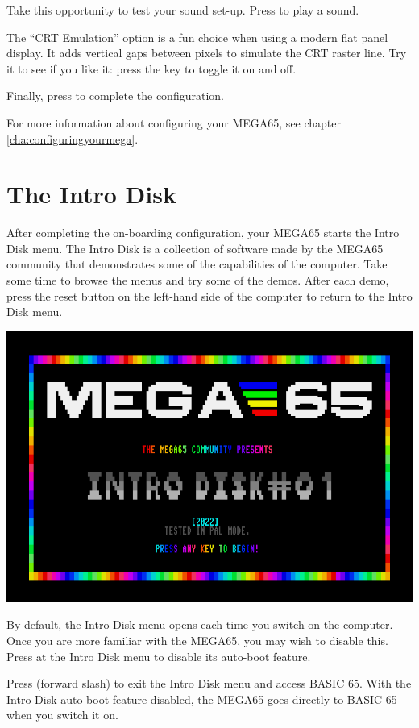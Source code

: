 Take this opportunity to test your sound set-up. Press  to play a sound.

The ``CRT Emulation'' option is a fun choice when using a modern flat panel display. It adds vertical gaps between pixels to simulate the CRT raster line. Try it to see if you like it: press the  key to toggle it on and off.

Finally, press  to complete the configuration.

For more information about configuring your MEGA65, see chapter \vref{cha:configuringyourmega}.

\section{The Intro Disk}

After completing the on-boarding configuration, your MEGA65 starts the Intro Disk menu. The Intro Disk is a collection of software made by the MEGA65 community that demonstrates some of the capabilities of the computer. Take some time to browse the menus and try some of the demos. After each demo, press the reset button on the left-hand side of the computer to return to the Intro Disk menu.

\begin{center}
  \includegraphics[width=0.7\linewidth]{images/demo_title.png}
\end{center}

By default, the Intro Disk menu opens each time you switch on the computer. Once you are more familiar with the MEGA65, you may wish to disable this. Press  at the Intro Disk menu to disable its auto-boot feature.

Press \megakey{/} (forward slash) to exit the Intro Disk menu and access BASIC 65. With the Intro Disk auto-boot feature disabled, the MEGA65 goes directly to BASIC 65 when you switch it on.

